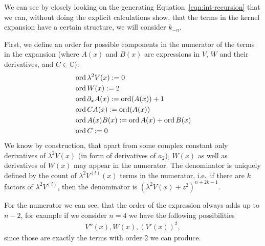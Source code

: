 \begin{Remark}
  We can see by closely looking on the generating
  Equation~\eqref{eqn:int-recursion} that we can, without doing the explicit
  calculations show, that the terms in the kernel expansion have a certain
  structure, we will consider $k_{-n}$.

  First, we define an order for possible components in the numerator of the
  terms in the expansion (where $A(x)$ and $B(x)$ are expressions in $V$, $W$
  and their derivatives, and $C\in\mathbb{C}$):
  \begin{align}
    &\operatorname{ord} \lambda^2 V(x) := 0 \\
    &\operatorname{ord} W(x) := 2 \\
    &\operatorname{ord} \partial_x A(x) := \operatorname{ord}(A(x)) + 1 \\
    &\operatorname{ord} CA(x) := \operatorname{ord}(A(x)) \\
    &\operatorname{ord} A(x)B(x) := \operatorname{ord} A(x) + \operatorname{ord} B(x) \\
    &\operatorname{ord} C := 0
  \end{align}
  We know by construction, that apart from some complex constant only
  derivatives of $\lambda^2 V(x)$ (in form of derivatives of $a_2$), $W(x)$ as
  well as derivatives of $W(x)$ may appear in the numerator. The denominator is
  uniquely defined by the count of $\lambda^2 V^{(l)}(x)$ terms in the
  numerator, i.e.\ if there are $k$ factors of $\lambda^2 V^{(l)}$, then the
  denominator is $(\lambda^2 V(x) + z^2)^{n+2k-1}$.

  For the numerator we can see, that the order of the expression always adds up
  to $n-2$, for example if we consider $n=4$ we have the following
  possibilities
  \begin{align*}
    V''(x), W(x), (V'(x))^2,
  \end{align*}
  since those are exactly the terms with order $2$ we can produce.


\end{Remark}
